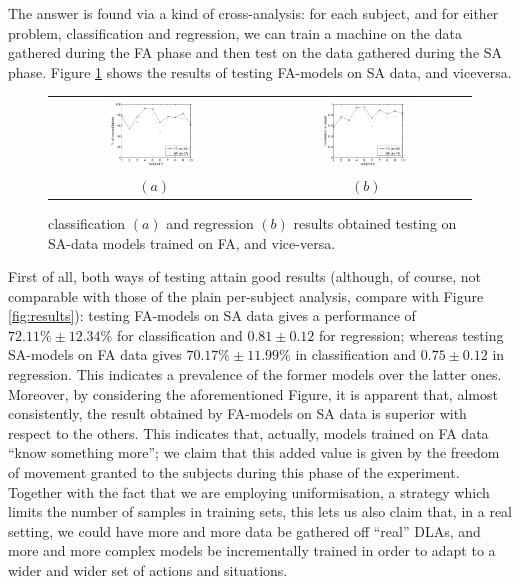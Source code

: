 The answer is found via a kind of cross-analysis: for each subject,
and for either problem, classification and regression, we can train a
machine on the data gathered during the FA phase and then test on the
data gathered during the SA phase. Figure \ref{fig:2on1} shows the
results of testing FA-models on SA data, and viceversa.

\begin{figure}[!ht] \centering
  \begin{tabular}{cc}
    \includegraphics[width=0.45\textwidth]{figs/2on1_class} &
    \includegraphics[width=0.45\textwidth]{figs/2on1_regr} \\
    $(a)$ & $(b)$ \\
  \end{tabular}
  \caption{classification $(a)$ and regression $(b)$ results obtained
    testing on SA-data models trained on FA, and vice-versa.}
  \label{fig:2on1}
\end{figure}

First of all, both ways of testing attain good results (although, of
course, not comparable with those of the plain per-subject analysis,
compare with Figure \ref{fig:results}): testing FA-models on SA data
gives a performance of $72.11\% \pm 12.34\%$ for classification and
$0.81 \pm 0.12$ for regression; whereas testing SA-models on FA data
gives $70.17\% \pm 11.99\%$ in classification and $0.75 \pm 0.12$ in
regression. This indicates a prevalence of the former models over the
latter ones. Moreover, by considering the aforementioned Figure, it is
apparent that, almost consistently, the result obtained by FA-models
on SA data is superior with respect to the others. This indicates
that, actually, models trained on FA data ``know something more''; we
claim that this added value is given by the freedom of movement
granted to the subjects during this phase of the experiment. Together
with the fact that we are employing uniformisation, a strategy which
limits the number of samples in training sets, this lets us also claim
that, in a real setting, we could have more and more data be gathered
off ``real'' DLAs, and more and more complex models be incrementally
trained in order to adapt to a wider and wider set of actions and
situations.

